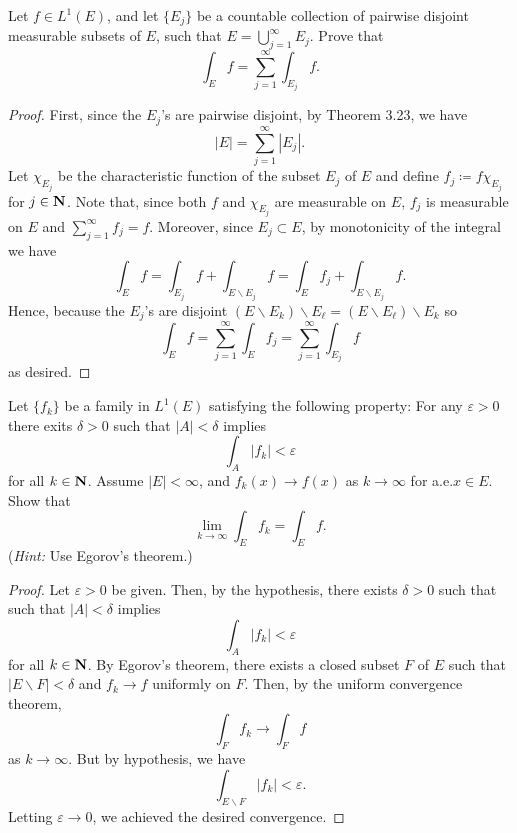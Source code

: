 \begin{problem}
Let $f\in L^1(E)$, and let $\{E_j\}$ be a countable collection of pairwise
disjoint measurable subsets of $E$, such that $E=\bigcup_{j=1}^\infty
E_j$. Prove that
\[
\int_E f=\sum_{j=1}^\infty\int_{E_j}f.
\]
\end{problem}
\begin{proof}
First, since the $E_j$'s are pairwise disjoint, by Theorem 3.23, we have
\begin{equation}
\label{eq:disjoint-measure-2-2}
|E|=\sum_{j=1}^\infty|E_j|.
\end{equation}
Let $\chi_{E_j}$ be the characteristic function of the subset $E_j$ of
$E$ and define $f_j\coloneqq f\chi_{E_j}$ for $j\in\mathbf{N}$. Note that, since
both $f$ and $\chi_{E_j}$ are measurable on $E$, $f_j$ is
measurable on $E$ and $\sum_{j=1}^\infty f_j=f$. Moreover, since
$E_j\subset E$, by monotonicity of the integral we have
\begin{equation}
\label{eq:monotonicity-2-2}
\int_{E} f=
\int_{E_j} f+\int_{E\smallsetminus E_j}f=
\int_E f_j+\int_{E\smallsetminus E_j}f.
\end{equation}
Hence, because the $E_j$'s are disjoint $(E\smallsetminus E_k)\smallsetminus
E_\ell=(E\smallsetminus E_\ell)\smallsetminus E_k$ so
\begin{equation}
\label{eq:desired-sum-2}
\int_E f=\sum_{j=1}^\infty\int_E f_j=\sum_{j=1}^\infty\int_{E_j}f
\end{equation}
as desired.
\end{proof}

\begin{problem}
Let $\{f_k\}$ be a family in $L^1(E)$ satisfying the following property:
For any $\varepsilon>0$ there exits $\delta>0$ such that $|A|<\delta$
implies
\[
\int_A |f_k|<\varepsilon
\]
for all $k\in\mathbf{N}$. Assume $|E|<\infty$, and $f_k(x)\to f(x)$ as
$k\to\infty$ for a.e.\@ $x\in E$. Show that
\[
\lim_{k\to\infty}\int_E f_k=\int_E f.
\]
(\emph{Hint:} Use Egorov's theorem.)
\end{problem}
\begin{proof}
Let $\varepsilon>0$ be given. Then, by the hypothesis, there exists
$\delta>0$ such that
such that $|A|<\delta$
implies
\begin{equation}
  \label{eq:hypothesis-2-3}
\int_A |f_k|<\varepsilon
\end{equation}
for all $k\in\mathbf{N}$. By Egorov's theorem, there exists a closed subset $F$
of $E$ such that $|E\smallsetminus F|<\delta$ and $f_k\to f$ uniformly on
$F$. Then, by the uniform convergence theorem,
\begin{equation}
\label{eq:uniform-convergence-2-3}
\int_F f_k\longrightarrow \int_F f
\end{equation}
as $k\to\infty$. But by hypothesis, we have
\begin{equation}
\label{eq:need-to-show-2-}
\int_{E\smallsetminus F} |f_k|<\varepsilon.
\end{equation}
Letting $\varepsilon\to 0$, we achieved the desired convergence.
\end{proof}

